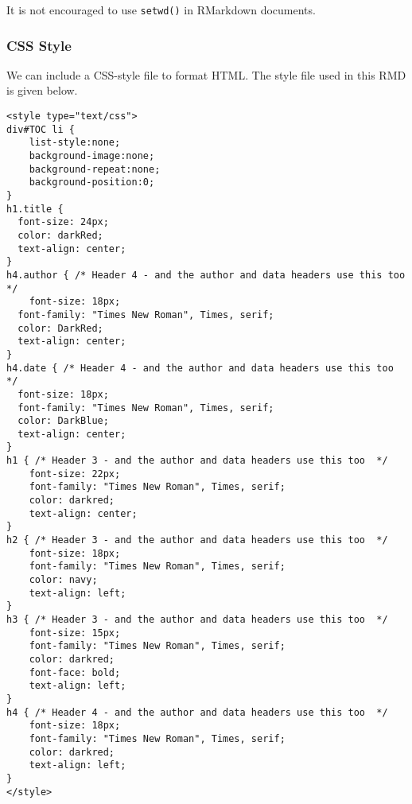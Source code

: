 \documentclass[
]{article}
\begin{document}
It is not encouraged to use \texttt{setwd()} in RMarkdown documents.

\hypertarget{css-style}{%
\subsubsection{CSS Style}\label{css-style}}

We can include a CSS-style file to format HTML. The style file used in
this RMD is given below.

\begin{verbatim}
<style type="text/css">
div#TOC li {
    list-style:none;
    background-image:none;
    background-repeat:none;
    background-position:0;
}
h1.title {
  font-size: 24px;
  color: darkRed;
  text-align: center;
}
h4.author { /* Header 4 - and the author and data headers use this too  */
    font-size: 18px;
  font-family: "Times New Roman", Times, serif;
  color: DarkRed;
  text-align: center;
}
h4.date { /* Header 4 - and the author and data headers use this too  */
  font-size: 18px;
  font-family: "Times New Roman", Times, serif;
  color: DarkBlue;
  text-align: center;
}
h1 { /* Header 3 - and the author and data headers use this too  */
    font-size: 22px;
    font-family: "Times New Roman", Times, serif;
    color: darkred;
    text-align: center;
}
h2 { /* Header 3 - and the author and data headers use this too  */
    font-size: 18px;
    font-family: "Times New Roman", Times, serif;
    color: navy;
    text-align: left;
}
h3 { /* Header 3 - and the author and data headers use this too  */
    font-size: 15px;
    font-family: "Times New Roman", Times, serif;
    color: darkred;
    font-face: bold;
    text-align: left;
}
h4 { /* Header 4 - and the author and data headers use this too  */
    font-size: 18px;
    font-family: "Times New Roman", Times, serif;
    color: darkred;
    text-align: left;
}
</style>
\end{verbatim}
\end{document}
